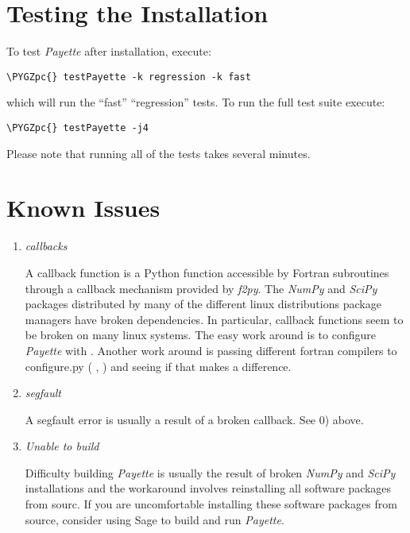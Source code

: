 \documentclass[letterpaper,10pt,english]{sphinxmanual}
\def\PYGZpc{\char`\%}
\begin{document}
\section{Testing the Installation}
\label{Files/building:testing-the-installation}
To test \emph{Payette} after installation, execute:

\begin{Verbatim}[commandchars=\\\{\}]
\PYGZpc{} testPayette -k regression -k fast
\end{Verbatim}

which will run the ``fast'' ``regression'' tests. To run the full test suite execute:

\begin{Verbatim}[commandchars=\\\{\}]
\PYGZpc{} testPayette -j4
\end{Verbatim}

Please note that running all of the tests takes several minutes.


\section{Known Issues}
\label{Files/building:known-issues}\begin{enumerate}
\item {} 
\emph{callbacks}

A callback function is a Python function accessible by Fortran subroutines
through a callback mechanism provided by \emph{f2py}. The \emph{NumPy} and \emph{SciPy}
packages distributed by many of the different linux distributions package
managers have broken dependencies. In particular, callback functions seem to
be broken on many linux systems. The easy work around is to configure
\emph{Payette} with . Another work around is passing different
fortran compilers to configure.py ( , ) and seeing
if that makes a difference.

\item {} 
\emph{segfault}

A segfault error is usually a result of a broken callback.  See 0) above.

\item {} 
\emph{Unable to build}

Difficulty building \emph{Payette} is usually the result of broken \emph{NumPy} and
\emph{SciPy} installations and the workaround involves reinstalling all software
packages from sourc. If you are uncomfortable installing these software
packages from source, consider using Sage to build and run \emph{Payette}.

\end{enumerate}
\end{document}
